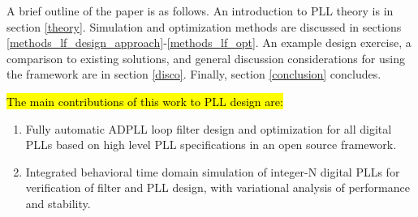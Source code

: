 A brief outline of the paper is as follows. An introduction to PLL theory is in section \ref{theory}. Simulation and optimization methods are discussed in sections \ref{methods_lf_design_approach}-\ref{methods_lf_opt}. An example design exercise, a comparison to existing solutions, and general discussion considerations for using the framework are in section \ref{disco}. Finally, section \ref{conclusion} concludes.
\vspace{1em}

\hl{The main contributions of this work to PLL design are:}
\vspace{-0.8em}
\begin{enumerate}[itemsep=0pt,label=\protect\mycirc{\arabic*}]
	\setlength\itemsep{-0.8em}
	\item Fully automatic ADPLL loop filter design and optimization for all digital PLLs based on high level PLL specifications in an open source framework.
	\item Integrated behavioral time domain simulation of integer-N digital PLLs for verification of filter and PLL design, with variational analysis of performance and stability.
\end{enumerate}
